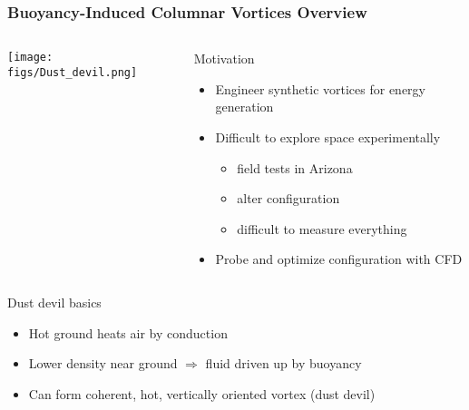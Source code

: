 \documentclass[mathserif]{beamer}
\begin{document}
\begin{frame}
\frametitle{Buoyancy-Induced Columnar Vortices Overview}
%
\begin{columns}[]
  \begin{column}{0.45\linewidth}
   \begin{center}
    \texttt{[image: figs/Dust\_devil.png]}
   \end{center}
  \end{column}
  \begin{column}{0.55\linewidth}
   \begin{block}{Motivation}
    \begin{itemize}
     \item Engineer synthetic vortices for energy generation
     \item Difficult to explore space experimentally
	   \begin{itemize}
	    \item field tests in Arizona
	    \item alter configuration
	    \item difficult to measure everything
	   \end{itemize}
     \item Probe and optimize configuration with CFD
    \end{itemize}
   \end{block}

  \end{column}
\end{columns}

\begin{block}{Dust devil basics}
  \begin{itemize}
  \item Hot ground heats air by conduction
  \item Lower density near ground $\Rightarrow$ fluid driven up by buoyancy
  \item Can form coherent, hot, vertically oriented vortex (dust devil)
  \end{itemize}
\end{block}

\end{frame}
\end{document}
